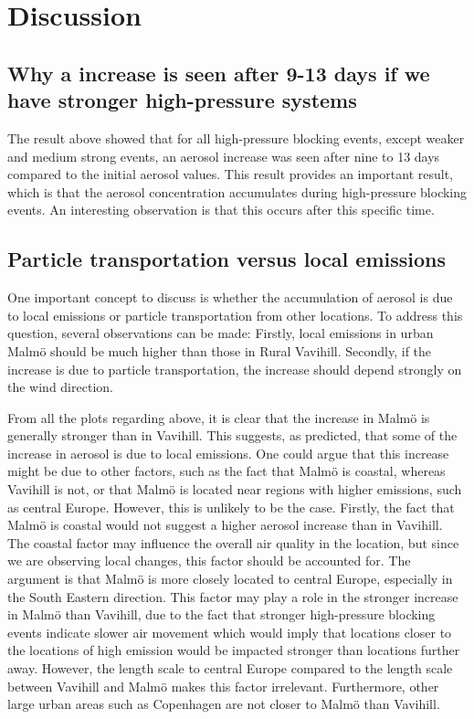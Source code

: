 \newpage
\section{Discussion}
\subsection{Why a increase is seen after 9-13 days if we have stronger high-pressure systems}
The result above showed that for all high-pressure blocking events, except weaker and medium strong events, an aerosol increase was seen after nine to 13 days compared to the initial aerosol values. This result provides an important result, which is that the aerosol concentration accumulates during high-pressure blocking events. An interesting observation is that this occurs after this specific time. 

\subsection{Particle transportation versus local emissions}
One important concept to discuss is whether the accumulation of aerosol is due to local emissions or particle transportation from other locations. To address this question, several observations can be made: Firstly, local emissions in urban Malmö should be much higher than those in Rural Vavihill. Secondly, if the increase is due to particle transportation, the increase should depend strongly on the wind direction. 

From all the plots regarding \PM above, it is clear that the increase in Malmö is generally stronger than in Vavihill. This suggests, as predicted, that some of the increase in aerosol is due to local emissions. One could argue that this increase might be due to other factors, such as the fact that Malmö is coastal, whereas Vavihill is not, or that Malmö is located near regions with higher emissions, such as central Europe. However, this is unlikely to be the case. Firstly, the fact that Malmö is coastal would not suggest a higher aerosol increase than in Vavihill. The coastal factor may influence the overall air quality in the location, but since we are observing local changes, this factor should be accounted for. The argument is that Malmö is more closely located to central Europe, especially in the South Eastern direction. This factor may play a role in the stronger increase in Malmö than Vavihill, due to the fact that stronger high-pressure blocking events indicate slower air movement which would imply  that locations closer to the locations of high emission would be impacted stronger than locations further away. However, the length scale to central Europe compared to the length scale between Vavihill and Malmö makes this factor irrelevant. Furthermore, other large urban areas such as Copenhagen are not closer to Malmö than Vavihill. 

